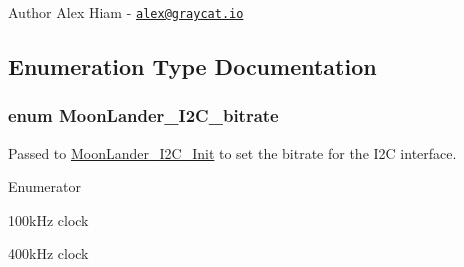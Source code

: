 \begin{DoxyAuthor}{Author}
Alex Hiam -\/ \href{mailto:alex@graycat.io}{\tt alex@graycat.\+io} 
\end{DoxyAuthor}


\subsection{Enumeration Type Documentation}
\subsubsection[{\texorpdfstring{Moon\+Lander\+\_\+\+I2\+C\+\_\+bitrate}{MoonLander_I2C_bitrate}}]{\setlength{\rightskip}{0pt plus 5cm}enum {\bf Moon\+Lander\+\_\+\+I2\+C\+\_\+bitrate}}\hypertarget{MoonLander-i2c_8h_a99b692076d07b714e6b130bdc715e3ee}{}\label{MoonLander-i2c_8h_a99b692076d07b714e6b130bdc715e3ee}
Passed to \hyperlink{MoonLander-i2c_8h_aa8b0b475cb2a4860cb5d6c4a13895129}{Moon\+Lander\+\_\+\+I2\+C\+\_\+\+Init} to set the bitrate for the I2C interface. \begin{Desc}
\item[Enumerator]\par
\begin{description}
\item[{\em 
M\+O\+O\+N\+L\+A\+N\+D\+E\+R\+\_\+\+I2\+C\+\_\+100K\hypertarget{MoonLander-i2c_8h_a99b692076d07b714e6b130bdc715e3eea9a053bd0e23847d1237ee0dfbd0af724}{}\label{MoonLander-i2c_8h_a99b692076d07b714e6b130bdc715e3eea9a053bd0e23847d1237ee0dfbd0af724}
}]100k\+Hz clock \item[{\em 
M\+O\+O\+N\+L\+A\+N\+D\+E\+R\+\_\+\+I2\+C\+\_\+400K\hypertarget{MoonLander-i2c_8h_a99b692076d07b714e6b130bdc715e3eeabb3ce3f508f70b572e65570bec3688d5}{}\label{MoonLander-i2c_8h_a99b692076d07b714e6b130bdc715e3eeabb3ce3f508f70b572e65570bec3688d5}
}]400k\+Hz clock \end{description}
\end{Desc}


